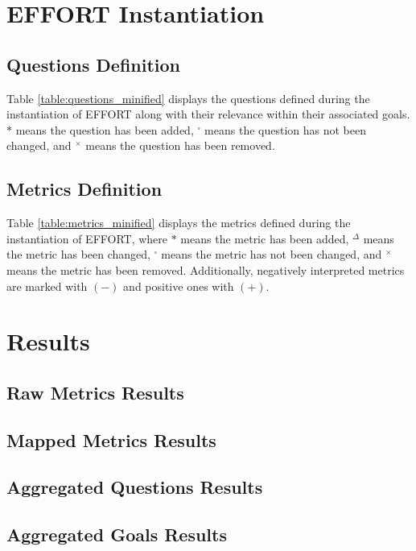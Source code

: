\chapter{EFFORT Instantiation}\label{appendix_a_effort_instantiation}

%
%
%
%
%

\section{Questions Definition}

Table \ref{table:questions_minified} displays the
questions defined during the instantiation of EFFORT
along with their relevance within their associated goals.
$*$ means the question has been added,
$^{\square}$ means the question has not been changed, and
$^{\times}$ means the question has been removed.



\section{Metrics Definition}

Table \ref{table:metrics_minified} displays the
metrics defined during the instantiation of EFFORT, where
$*$ means the metric has been added,
$^{\Delta}$ means the metric has been changed,
$^{\square}$ means the metric has not been changed, and
$^{\times}$ means the metric has been removed.
Additionally, negatively interpreted metrics are marked with $(-)$
and positive ones with $(+)$.



\chapter{Results}\label{appendix_b_results}

\section{Raw Metrics Results}



\section{Mapped Metrics Results}



\section{Aggregated Questions Results}



\section{Aggregated Goals Results}



\pagebreak

